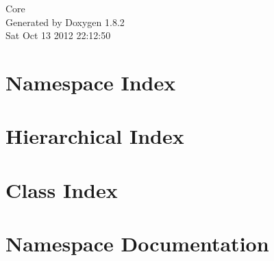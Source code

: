 \documentclass{book}
\begin{document}
\hypersetup{pageanchor=false,citecolor=blue}
\begin{titlepage}
\vspace*{7cm}
\begin{center}
{\Large Core }\\
\vspace*{1cm}
{\large Generated by Doxygen 1.8.2}\\
\vspace*{0.5cm}
{\small Sat Oct 13 2012 22:12:50}\\
\end{center}
\end{titlepage}
\clearemptydoublepage
{}
\tableofcontents
\clearemptydoublepage
{}
\hypersetup{pageanchor=true,citecolor=blue}
\chapter{Namespace Index}

\chapter{Hierarchical Index}

\chapter{Class Index}

\chapter{Namespace Documentation}

\end{document}
